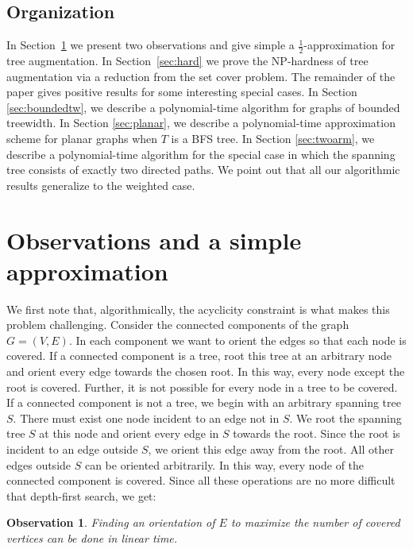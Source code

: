 \documentclass{article}
\newtheorem{obs}[theorem]{Observation}
\begin{document}
\subsection{Organization}

In Section~\ref{sec:comp} we present two observations and give simple a
$\frac{1}{2}$-approximation for {\sc tree augmentation}.  In
Section~\ref{sec:hard} we prove the NP-hardness of {\sc tree augmentation} via a reduction from
the {\sc set cover} problem. The remainder of the paper gives positive
results for some interesting special cases.  In Section
\ref{sec:boundedtw}, we describe a polynomial-time algorithm for
graphs of bounded treewidth.  In Section \ref{sec:planar}, we describe
a polynomial-time approximation scheme for planar graphs when $T$ is a
BFS tree. In Section \ref{sec:twoarm}, we describe a polynomial-time
algorithm for the special case in which the spanning tree consists of
exactly two directed paths.  We point out
that all our algorithmic results generalize to the weighted case.

\section{Observations and a simple approximation}\label{sec:comp}

We first note that, algorithmically, the acyclicity constraint is what
makes this problem challenging.  Consider the connected components of
the graph $G = (V,E)$.  In each component we want to orient the edges
so that each node is covered.  If a connected component is a tree,
root this tree at an arbitrary node and orient every edge towards the
chosen root.  In this way, every node except the root is covered.
Further, it is not possible for every node in a tree to be covered.
If a connected component is not a tree, we begin with an arbitrary
spanning tree $S$.  There must exist one node incident to an edge not
in $S$.  We root the spanning tree $S$ at this node and orient every
edge in $S$ towards the root.  Since the root is incident to an edge
outside $S$, we orient this edge away from the root.  All other edges
outside $S$ can be oriented arbitrarily.  In this way, every node of
the connected component is covered.   Since all these operations are
no more difficult that depth-first search, we get:

\begin{obs}\label{obs:cyclic}
  Finding an orientation of $E$ to maximize the number of covered
  vertices can be done in linear time.
\end{obs}
\end{document}
